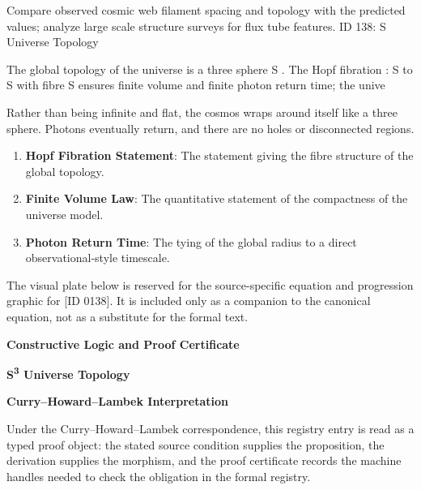 Compare observed cosmic web filament spacing and topology with the predicted values; analyze large scale structure surveys for flux tube features. ID 138: S  Universe Topology

The global topology of the universe is a three sphere S . The Hopf fibration  : S  to S  with fibre S  ensures finite volume and finite photon return time; the unive

Rather than being infinite and flat, the cosmos wraps around itself like a three sphere. Photons eventually return, and there are no holes or disconnected regions.
\endgroup

\begin{enumerate}[leftmargin=1.6em,itemsep=6pt,topsep=4pt]
\item \textbf{Hopf Fibration Statement}: The statement giving the fibre structure of the global topology.
\item \textbf{Finite Volume Law}: The quantitative statement of the compactness of the universe model.
\item \textbf{Photon Return Time}: The tying of the global radius to a direct observational-style timescale.
\end{enumerate}

\begingroup\footnotesize\sloppy
The visual plate below is reserved for the source-specific equation and progression graphic for [ID 0138]. It is included only as a companion to the canonical equation, not as a substitute for the formal text.
\par\endgroup
\ifTZPDarkEdition
{}
\fi

\clearpage
\begingroup\tzpsupportsetup
\noindent\textbf{\fontsize{10.8pt}{12.8pt}\selectfont [ID 0138] Constructive Logic and Proof Certificate}\par
\noindent\textbf{\fontsize{10pt}{12pt}\selectfont S\textsuperscript{3} Universe Topology}\par
\vspace{0.45em}
\begingroup
\footnotesize
\setlength{\parskip}{0.22em}
\setlength{\parindent}{0pt}
\noindent\textbf{Curry--Howard--Lambek Interpretation}\par
Under the Curry--Howard--Lambek correspondence, this registry entry is read as a typed proof
object: the stated source condition supplies the proposition, the derivation supplies the
morphism, and the proof certificate records the machine handles needed to check the obligation
in the formal registry.

